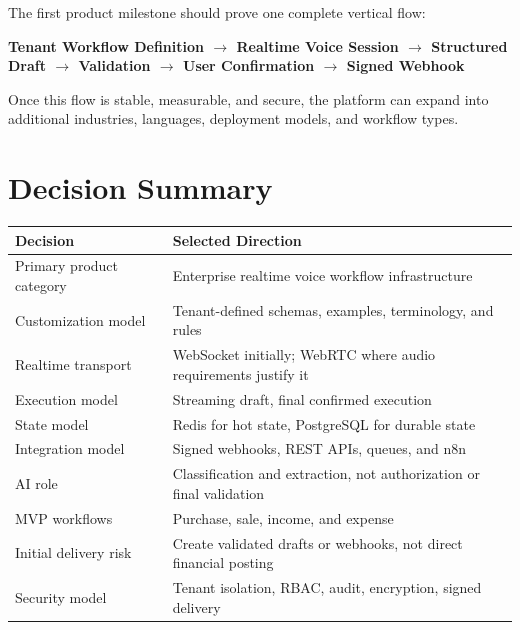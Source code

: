 \documentclass[11pt,a4paper]{article}
\begin{document}
The first product milestone should prove one complete vertical flow:

\begin{center}
\textbf{
Tenant Workflow Definition
$\rightarrow$
Realtime Voice Session
$\rightarrow$
Structured Draft
$\rightarrow$
Validation
$\rightarrow$
User Confirmation
$\rightarrow$
Signed Webhook
}
\end{center}

Once this flow is stable, measurable, and secure, the platform can expand
into additional industries, languages, deployment models, and workflow
types.

\appendix

\section{Decision Summary}

\begin{tabularx}{\textwidth}{L{53mm}Y}
\toprule
\textbf{Decision} & \textbf{Selected Direction} \\
\midrule
Primary product category
& Enterprise realtime voice workflow infrastructure \\

Customization model
& Tenant-defined schemas, examples, terminology, and rules \\

Realtime transport
& WebSocket initially; WebRTC where audio requirements justify it \\

Execution model
& Streaming draft, final confirmed execution \\

State model
& Redis for hot state, PostgreSQL for durable state \\

Integration model
& Signed webhooks, REST APIs, queues, and n8n \\

AI role
& Classification and extraction, not authorization or final validation \\

MVP workflows
& Purchase, sale, income, and expense \\

Initial delivery risk
& Create validated drafts or webhooks, not direct financial posting \\

Security model
& Tenant isolation, RBAC, audit, encryption, signed delivery \\
\bottomrule
\end{tabularx}
\end{document}
